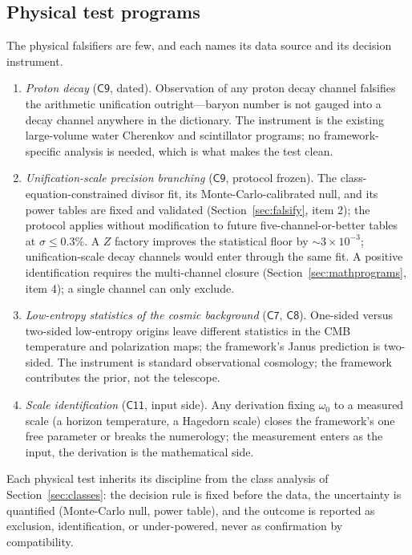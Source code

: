\documentclass[11pt,a4paper]{article}
\theoremstyle{plain}
\theoremstyle{definition}
\theoremstyle{remark}
\begin{document}
\subsection{Physical test programs}\label{sec:physical}

The physical falsifiers are few, and each names its data source and its decision
instrument.

\begin{enumerate}[leftmargin=1.6em]
\item \emph{Proton decay} ($\mathsf{C9}$, dated). Observation of any proton decay channel
falsifies the arithmetic unification outright---baryon number is not gauged into a decay
channel anywhere in the dictionary. The instrument is the existing large-volume water
Cherenkov and scintillator programs; no framework-specific analysis is needed, which is
what makes the test clean.
\item \emph{Unification-scale precision branching} ($\mathsf{C9}$, protocol frozen). The
class-equation-constrained divisor fit, its Monte-Carlo-calibrated null, and its power
tables are fixed and validated (Section~\ref{sec:falsify}, item 2); the protocol applies
without modification to future five-channel-or-better tables at $\sigma\leq0.3\%$. A $Z$
factory improves the statistical floor by $\sim3\times10^{-3}$; unification-scale decay
channels would enter through the same fit. A positive identification requires the
multi-channel closure (Section~\ref{sec:mathprograms}, item 4); a single channel can only
exclude.
\item \emph{Low-entropy statistics of the cosmic background} ($\mathsf{C7}$, $\mathsf{C8}$).
One-sided versus two-sided low-entropy origins leave different statistics in the CMB
temperature and polarization maps; the framework's Janus prediction is two-sided. The
instrument is standard observational cosmology; the framework contributes the prior, not
the telescope.
\item \emph{Scale identification} ($\mathsf{C11}$, input side). Any derivation fixing
$\omega_{0}$ to a measured scale (a horizon temperature, a Hagedorn scale) closes the
framework's one free parameter or breaks the numerology; the measurement enters as the
input, the derivation is the mathematical side.
\end{enumerate}

Each physical test inherits its discipline from the class analysis of
Section~\ref{sec:classes}: the decision rule is fixed before the data, the uncertainty is
quantified (Monte-Carlo null, power table), and the outcome is reported as exclusion,
identification, or under-powered, never as confirmation by compatibility.
\end{document}
